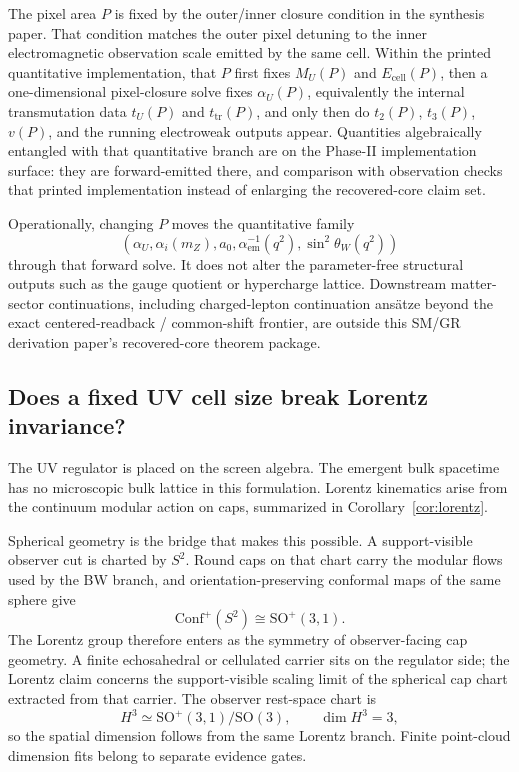 \documentclass[11pt]{article}
\newcommand{\Conf}{\mathrm{Conf}}
\begin{document}
The pixel area \(P\) is fixed by the outer/inner closure condition in the synthesis paper. That
condition matches the outer pixel detuning to the inner electromagnetic observation scale emitted
by the same cell. Within the printed quantitative implementation, that \(P\) first fixes \(M_U(P)\) and \(E_{\mathrm{cell}}(P)\), then a
one-dimensional pixel-closure solve fixes \(\alpha_U(P)\), equivalently the internal transmutation
data \(t_U(P)\) and \(t_{\mathrm{tr}}(P)\), and only then do \(t_2(P)\), \(t_3(P)\), \(v(P)\), and
the running electroweak outputs appear. Quantities algebraically entangled with that quantitative
branch are on the Phase-II implementation surface: they are forward-emitted there, and
comparison with observation checks that printed implementation instead of enlarging the
recovered-core claim set.

Operationally, changing \(P\) moves the quantitative family
\[
(\alpha_U,\alpha_i(m_Z),a_0,\alpha_{\mathrm{em}}^{-1}(q^2),\sin^2\theta_W(q^2))
\]
through that forward solve. It does not alter the parameter-free structural outputs such as the
gauge quotient or hypercharge lattice. Downstream matter-sector continuations, including
charged-lepton continuation ans\"atze beyond the exact centered-readback / common-shift frontier,
are outside this SM/GR derivation paper's recovered-core theorem package.

\subsection{Does a fixed UV cell size break Lorentz invariance?}

The UV regulator is placed on the screen algebra. The emergent bulk spacetime has no microscopic
bulk lattice in this formulation. Lorentz kinematics arise from the continuum modular action on
caps, summarized in Corollary~\ref{cor:lorentz}.

Spherical geometry is the bridge that makes this possible. A support-visible observer cut is
charted by \(S^2\). Round caps on that chart carry the modular flows used by the BW branch, and
orientation-preserving conformal maps of the same sphere give
\[
\Conf^+(S^2)\cong \mathrm{SO}^+(3,1).
\]
The Lorentz group therefore enters as the symmetry of observer-facing cap geometry. A finite
echosahedral or cellulated carrier sits on the regulator side; the Lorentz claim concerns the
support-visible scaling limit of the spherical cap chart extracted from that carrier.
The observer rest-space chart is
\[
H^3\simeq \mathrm{SO}^+(3,1)/\mathrm{SO}(3),
\qquad
\dim H^3=3,
\]
so the spatial dimension follows from the same Lorentz branch. Finite point-cloud dimension fits belong to separate evidence gates.
\end{document}
